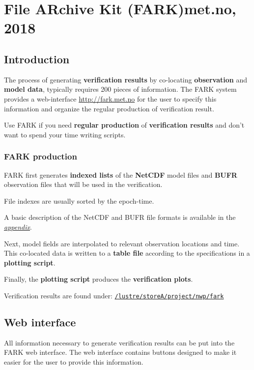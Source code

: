 \documentclass[letterpaper,10pt,twoside,twocolumn,openany]{book}
\begin{document}

\chapter{File ARchive Kit (FARK)\tiny{met.no, 2018}}

\section{Introduction}
The process of generating {\bf verification results} by co-locating {\bf observation} and {\bf model data}, 
typically requires 200 pieces of information.
The FARK system provides a web-interface \url{http://fark.met.no} for the user to specify this information and
organize the regular production of verification result.

\begin{quotebox}
   Use FARK if you need {\bf regular production} of {\bf verification results} 
   and don't want to spend your time writing scripts.
\end{quotebox}

\subsection{FARK production}

FARK first generates {\bf indexed lists} of the {\bf NetCDF} model files 
and {\bf BUFR} observation files that will be used in the verification.
\begin{quotebox}
File indexes are usually sorted by the epoch-time.
\end{quotebox}
A basic description of the NetCDF and BUFR file formats is available in the \hyperlink{appendix}{{\em appendix}}.

Next, model fields are interpolated to relevant observation locations and time.
This co-located data is written to a {\bf table file} according to the specifications in a {\bf plotting script}.

Finally, the {\bf plotting script} produces the {\bf verification plots}.

\begin{quotebox}
Verification results are found under:
\href{/lustre/storeA/project/nwp/fark/.}{\lstinline!/lustre/storeA/project/nwp/fark!}
\end{quotebox}

\section{Web interface}
All information necessary to generate verification results can
be put into the FARK web interface.
The web interface contains buttons designed to make it easier for the
user to provide this information.
\end{document}
